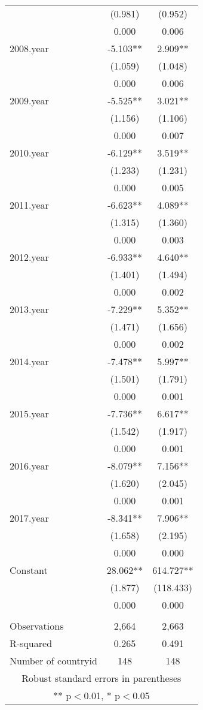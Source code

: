 \begin{tabular}{lcc}
 & (0.981) & (0.952) \\
 & 0.000 & 0.006 \\
2008.year & -5.103** & 2.909** \\
 & (1.059) & (1.048) \\
 & 0.000 & 0.006 \\
2009.year & -5.525** & 3.021** \\
 & (1.156) & (1.106) \\
 & 0.000 & 0.007 \\
2010.year & -6.129** & 3.519** \\
 & (1.233) & (1.231) \\
 & 0.000 & 0.005 \\
2011.year & -6.623** & 4.089** \\
 & (1.315) & (1.360) \\
 & 0.000 & 0.003 \\
2012.year & -6.933** & 4.640** \\
 & (1.401) & (1.494) \\
 & 0.000 & 0.002 \\
2013.year & -7.229** & 5.352** \\
 & (1.471) & (1.656) \\
 & 0.000 & 0.002 \\
2014.year & -7.478** & 5.997** \\
 & (1.501) & (1.791) \\
 & 0.000 & 0.001 \\
2015.year & -7.736** & 6.617** \\
 & (1.542) & (1.917) \\
 & 0.000 & 0.001 \\
2016.year & -8.079** & 7.156** \\
 & (1.620) & (2.045) \\
 & 0.000 & 0.001 \\
2017.year & -8.341** & 7.906** \\
 & (1.658) & (2.195) \\
 & 0.000 & 0.000 \\
Constant & 28.062** & 614.727** \\
 & (1.877) & (118.433) \\
 & 0.000 & 0.000 \\
 &  &  \\
Observations & 2,664 & 2,663 \\
R-squared & 0.265 & 0.491 \\
 Number of countryid & 148 & 148 \\ \hline
\multicolumn{3}{c}{ Robust standard errors in parentheses} \\
\multicolumn{3}{c}{ ** p$<$0.01, * p$<$0.05} \\
\end{tabular}
